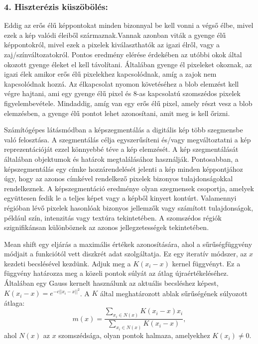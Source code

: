 \subsubsection{4. Hiszterézis küszöbölés:}

Eddig az erős élű képpontokat minden bizonnyal be kell vonni a végső élbe, mivel ezek a kép valódi éleiből származnak.Vannak azonban viták a gyenge élű képpontokról, mivel ezek a pixelek kiválaszthatók az igazi élről, vagy a zaj/színváltozatokról. Pontos eredmény elérése érdekében az utóbbi okok által okozott gyenge éleket el kell távolítani. Általában gyenge él pixeleket okoznak, az igazi élek amikor erős élű pixelekhez kapcsolódnak, amíg a zajok nem kapcsolódnak hozzá. Az élkapcsolat nyomon követéséhez a blob elemzést kell végre hajtani, ami egy gyenge élű pixel és 8-as kapcsolatú szomszédos pixelek figyelembevétele. Mindaddig, amíg van egy erős élű pixel, amely részt vesz a blob elemzésben, a gyenge élű pontot lehet azonosítani, amit meg is kell őrizni.



Számítógépes látásmódban a képszegmentálás a digitális kép több szegmensbe való felosztása. A szegmentálás célja egyszerűsíteni és/vagy megváltoztatni a kép reprezentációját ezzel könnyebbé téve a kép elemzését. A kép szegmentálását általában objektumok és határok megtalálásához használják. Pontosabban, a képszegmentálás egy címke hozzárendelését jelenti a kép minden képpontjához úgy, hogy az azonos címkével rendelkező pixelek bizonyos tulajdonságokkal rendelkeznek. A képszegmentáció eredménye olyan szegmensek csoportja, amelyek együttesen fedik le a teljes képet vagy a képből kinyert kontúrt. Valamennyi régióban lévő pixelek hasonlóak bizonyos jellemzők vagy számított tulajdonságok, például szín, intenzitás vagy textúra tekintetében. A szomszédos régiók szignifikánsan különböznek az azonos jellegzetességek tekintetében.



Mean shift egy eljárás a maximális értékek azonosítására, ahol a sűrűségfüggvény módjait a funkciótól vett diszkrét adat szolgáltatja. Ez egy iteratív módszer, az $x$ kezdeti becslésével kezdünk. Adjuk meg a $K(x_i - x)$ kernel függvényt. Ez a függvény határozza meg a közeli pontok súlyát az átlag újraértékeléséhez. Általában egy Gauss kernelt használunk az aktuális becsléshez képest, $K (x_i - x) = e ^ {- c || x_i - x || ^ 2}$. A $K$ által meghatározott ablak sűrűségének súlyozott átlaga: 
$$
m(x) =
\frac{\sum_{x_i \in N(x)}K(x_i-x)x_i}{\sum_{x_i \in N(x)}K(x_i-x)},
$$
ahol $N(x)$ az $x$ szomszédsága, olyan pontok halmaza, amelyekhez $K(x_ {i}) \neq 0$.

